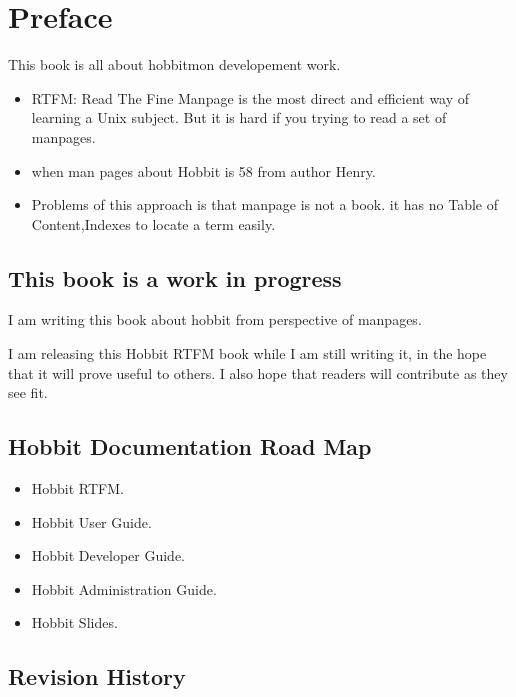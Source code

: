 \chapter{Preface}
\label{chap:preface}

This book is all about hobbitmon developement work.


\begin{itemize}
\item RTFM: Read The Fine Manpage is the most direct and efficient way of
learning a Unix subject. But it is hard if you trying to read a set of manpages.
\item  when man pages about Hobbit is 58 from author Henry.
\item Problems of this approach is that manpage is not a book. it has no
Table of Content,Indexes to locate a term easily.

\end{itemize}

\section{This book is a work in progress}

I am writing this  book about hobbit from perspective of manpages.  

I am releasing this Hobbit RTFM book while I am still writing it, in the hope that
it will prove useful to others.  I also hope that readers will contribute as they see fit.

\section{Hobbit Documentation Road Map}


\begin{itemize}
\item Hobbit RTFM.
\item Hobbit User Guide.
\item Hobbit Developer Guide.
\item Hobbit Administration Guide.
\item Hobbit Slides.

\end{itemize}

\section{Revision History}

